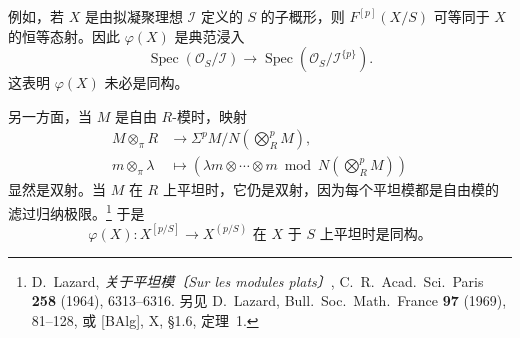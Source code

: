 例如，若 \(X\) 是由拟凝聚理想 \(\mathcal I\) 定义的 \(S\) 的子概形，则 \(F^{[p]}(X/S)\) 可等同于 \(X\) 的恒等态射。因此 \(\varphi(X)\) 是典范浸入
\[
  \operatorname{Spec}(\mathcal O_S/\mathcal I)
  \longrightarrow
  \operatorname{Spec}(\mathcal O_S/\mathcal I^{\{p\}}).
\]
这表明 \(\varphi(X)\) 未必是同构。

另一方面，当 \(M\) 是自由 \(R\)-模时，映射
\[
\begin{aligned}
  M\otimes_\pi R
  &\longrightarrow
  \Sigma^p M\big/
    N\!\left(\bigotimes_R^p M\right), \\
  m\otimes_\pi\lambda
  &\longmapsto
  \left(
    \lambda m\otimes\cdots\otimes m
    \bmod
    N\!\left(\bigotimes_R^p M\right)
  \right)
\end{aligned}
\]
显然是双射。当 \(M\) 在 \(R\) 上平坦时，它仍是双射，因为每个平坦模都是自由模的滤过归纳极限。\footnote{D.~Lazard,
\emph{关于平坦模〔Sur les modules plats〕}, C.\ R.\ Acad.\ Sci.\ Paris
\textbf{258} (1964), 6313--6316. 另见
D.~Lazard, Bull.\ Soc.\ Math.\ France \textbf{97} (1969), 81--128,
或 \textup{[BAlg]}, X, \S1.6, 定理~1.}
于是
\[
  \boxed{\;
  \varphi(X):X^{[p/S]}\longrightarrow X^{(p/S)}
  \text{ 在 \(X\) 于 \(S\) 上平坦时是同构。}
  \;}
\]

